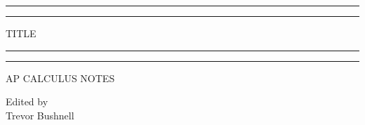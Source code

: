 \documentclass{package/notes}
\begin{document}
	\begin{titlepage} %
		
		\centering %
		
		\scshape %
		
		\vspace*{\baselineskip} %
		
		
		\rule{\textwidth}{1.6pt}\vspace*{-\baselineskip}\vspace*{2pt} %
		\rule{\textwidth}{0.4pt} %
		
		\vspace{0.75\baselineskip} %
		
		{\huge TITLE\\} %
		
		\vspace{0.75\baselineskip} %
		
		\rule{\textwidth}{0.4pt}\vspace*{-\baselineskip}\vspace{3.2pt} %
		\rule{\textwidth}{1.6pt} %
		
		\vspace{2\baselineskip} %
		
		
		\LARGE{AP CALCULUS NOTES} 
		
		\vspace*{3\baselineskip} %
		
		
		
		\vspace{0.5\baselineskip} 
		
		
		
		\vspace{0.5\baselineskip} 
		
		
		
		\vfill 
		
		
		
		\vspace{0.3\baselineskip} 
		
		
		{\large Edited by\\  Trevor Bushnell } 
		
	\end{titlepage}
	\tableofcontents
\end{document}
